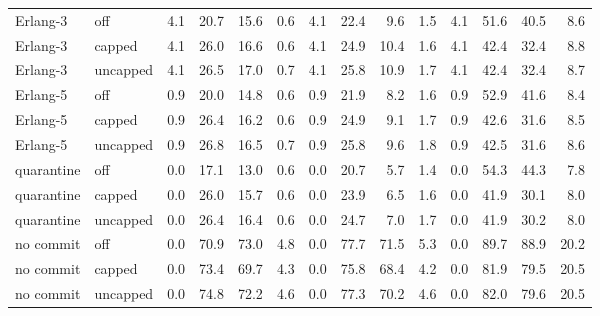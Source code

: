 \begin{table}[!t]
\begin{tabular}{@{}llrrrrrrrrrrrr@{}}
\midrule
Erlang-3 & off & 4.1 & 20.7 & 15.6 & 0.6 & 4.1 & 22.4 & 9.6 & 1.5 & 4.1 & 51.6 & 40.5 & 8.6 \\
Erlang-3 & capped & 4.1 & 26.0 & 16.6 & 0.6 & 4.1 & 24.9 & 10.4 & 1.6 & 4.1 & 42.4 & 32.4 & 8.8 \\
Erlang-3 & uncapped & 4.1 & 26.5 & 17.0 & 0.7 & 4.1 & 25.8 & 10.9 & 1.7 & 4.1 & 42.4 & 32.4 & 8.7 \\
\midrule
Erlang-5 & off & 0.9 & 20.0 & 14.8 & 0.6 & 0.9 & 21.9 & 8.2 & 1.6 & 0.9 & 52.9 & 41.6 & 8.4 \\
Erlang-5 & capped & 0.9 & 26.4 & 16.2 & 0.6 & 0.9 & 24.9 & 9.1 & 1.7 & 0.9 & 42.6 & 31.6 & 8.5 \\
Erlang-5 & uncapped & 0.9 & 26.8 & 16.5 & 0.7 & 0.9 & 25.8 & 9.6 & 1.8 & 0.9 & 42.5 & 31.6 & 8.6 \\
\midrule
quarantine & off & 0.0 & 17.1 & 13.0 & 0.6 & 0.0 & 20.7 & 5.7 & 1.4 & 0.0 & 54.3 & 44.3 & 7.8 \\
quarantine & capped & 0.0 & 26.0 & 15.7 & 0.6 & 0.0 & 23.9 & 6.5 & 1.6 & 0.0 & 41.9 & 30.1 & 8.0 \\
quarantine & uncapped & 0.0 & 26.4 & 16.4 & 0.6 & 0.0 & 24.7 & 7.0 & 1.7 & 0.0 & 41.9 & 30.2 & 8.0 \\
\midrule
no commit & off & 0.0 & 70.9 & 73.0 & 4.8 & 0.0 & 77.7 & 71.5 & 5.3 & 0.0 & 89.7 & 88.9 & 20.2 \\
no commit & capped & 0.0 & 73.4 & 69.7 & 4.3 & 0.0 & 75.8 & 68.4 & 4.2 & 0.0 & 81.9 & 79.5 & 20.5 \\
no commit & uncapped & 0.0 & 74.8 & 72.2 & 4.6 & 0.0 & 77.3 & 70.2 & 4.6 & 0.0 & 82.0 & 79.6 & 20.5 \\
\bottomrule
\end{tabular}
\end{table}
